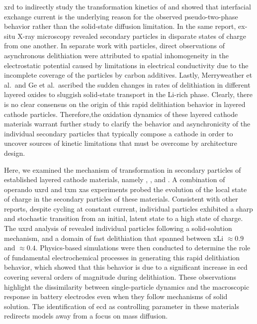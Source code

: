\documentclass{article}
\begin{document}
\gls{xrd} to indirectly study the transformation kinetics of
\nmc[333]{} and showed that interfacial exchange current is the
underlying reason for the observed pseudo-two-phase behavior rather
than the solid-state diffusion limitation. In the same report, ex-situ
X-ray microscopy revealed secondary particles in disparate states of
charge from one another. In separate work with \nmc[532]{}
particles,\cite{zhao2022} direct observations of asynchronous
delithiation were attributed to spatial inhomogeneity in the
electrostatic potential caused by limitations in electrical
conductivity due to the incomplete coverage of the particles by carbon
additives. Lastly, Merryweather et al.\cite{rao2021}\ and Ge et
al.\cite{wang2020-6}\ ascribed the sudden changes in rates of
delithiation in different layered oxides to sluggish solid-state
transport in the Li-rich phase. Clearly, there is no clear consensus
on the origin of this rapid delithiation behavior in layered cathode
particles. Therefore,the oxidation dynamics of these layered cathode
materials warrant further study to clarify the behavior and
asynchronicity of the individual secondary particles that typically
compose a cathode in order to uncover sources of kinetic limitations
that must be overcome by architecture design.

Here, we examined the mechanism of transformation in secondary
particles of established layered cathode materials, namely \nca{},
\nmc[333]{}, and \nmc[532]{}. A combination of operando \gls{uxrd} and
\gls{txm} \gls{xas} experiments probed the evolution of the local
state of charge in the secondary particles of these
materials. Consistent with other reports, despite cycling at constant
current, individual particles exhibited a sharp and stochastic
transition from an initial, latent state to a high state of
charge. The \gls{uxrd} analysis of \nca{} revealed individual
particles following a solid-solution mechanism, and a domain of fast
delithiation that spanned between \gls{xLi} $\approx 0.9$ and $\approx
0.4$.  Physics-based simulations were then conducted to determine the
role of fundamental electrochemical processes in generating this rapid
delithiation behavior, which showed that this behavior is due to a
significant increase in \gls{ecd} covering several orders of magnitude
during delithiation. These observations highlight the dissimilarity
between single-particle dynamics and the macroscopic response in
battery electrodes even when they follow mechanisms of solid
solution. The identification of \gls{ecd} as controlling parameter in
these materials redirects models away from a focus on mass diffusion.
\end{document}
